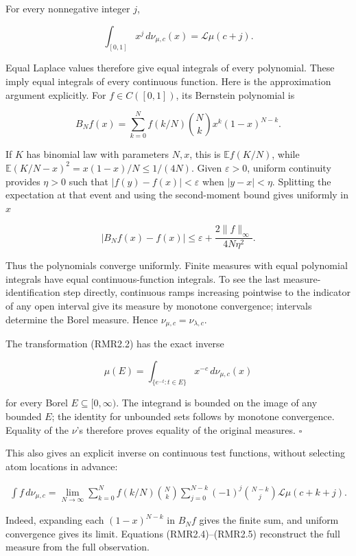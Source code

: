\documentclass[
]{article}
\begin{document}
For every nonnegative integer \(j\),

\[
\int_{[0,1]}x^j\,d\nu_{\mu,c}(x)=\mathcal L\mu(c+j).
\tag{RMR2.3}
\]

Equal Laplace values therefore give equal integrals of every polynomial.
These imply equal integrals of every continuous function. Here is the
approximation argument explicitly. For \(f\in C([0,1])\), its Bernstein
polynomial is

\[
B_Nf(x)=\sum_{k=0}^N f(k/N)\binom Nk x^k(1-x)^{N-k}.
\]

If \(K\) has binomial law with parameters \(N,x\), this is
\(\mathbb E f(K/N)\), while \(\mathbb E(K/N-x)^2=x(1-x)/N\le1/(4N)\).
Given \(\varepsilon>0\), uniform continuity provides \(\eta>0\) such
that \(|f(y)-f(x)|<\varepsilon\) when \(|y-x|<\eta\). Splitting the
expectation at that event and using the second-moment bound gives
uniformly in \(x\)

\[
|B_Nf(x)-f(x)|
\le\varepsilon+\frac{2\|f\|_\infty}{4N\eta^2}.
\]

Thus the polynomials converge uniformly. Finite measures with equal
polynomial integrals have equal continuous-function integrals. To see
the last measure-identification step directly, continuous ramps
increasing pointwise to the indicator of any open interval give its
measure by monotone convergence; intervals determine the Borel measure.
Hence \(\nu_{\mu,c}=\nu_{\lambda,c}\).

The transformation (RMR2.2) has the exact inverse

\[
\mu(E)=\int_{\{e^{-t}:t\in E\}}x^{-c}\,d\nu_{\mu,c}(x)
\tag{RMR2.4}
\]

for every Borel \(E\subseteq[0,\infty)\). The integrand is bounded on
the image of any bounded \(E\); the identity for unbounded sets follows
by monotone convergence. Equality of the \(\nu\)'s therefore proves
equality of the original measures. \(\square\)

This also gives an explicit inverse on continuous test functions,
without selecting atom locations in advance:

\[
\begin{aligned}
\int f\,d\nu_{\mu,c}
=\lim_{N\to\infty}\sum_{k=0}^N f(k/N)\binom Nk
\sum_{j=0}^{N-k}(-1)^j\binom{N-k}{j}
\mathcal L\mu(c+k+j).
\end{aligned}
\tag{RMR2.5}
\]

Indeed, expanding each \((1-x)^{N-k}\) in \(B_Nf\) gives the finite sum,
and uniform convergence gives its limit. Equations (RMR2.4)--(RMR2.5)
reconstruct the full measure from the full observation.
\end{document}

